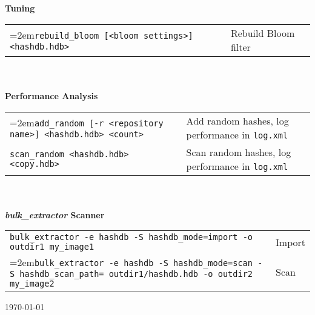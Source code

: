 \documentclass[12pt]{article}
\newcommand{\bulk}{\emph{bulk\_extractor}\xspace}
\begin{document}
\\
\\
\textbf{Tuning}\\
\begin{tabular}{p{3.6 in} p{4 in}}
\hangindent=2em\small\texttt{rebuild\_bloom [<bloom settings>] <hashdb.hdb>} & Rebuild Bloom filter \\
\end{tabular}
\\
\\
\textbf{Performance Analysis}\\
\begin{tabular}{p{3.6 in} p{4 in}}
\hangindent=2em\small\texttt{add\_random [-r <repository name>] <hashdb.hdb> <count>} & Add random hashes, log performance in \texttt{log.xml}\\
\small\texttt{scan\_random <hashdb.hdb> <copy.hdb>} & Scan random hashes, log performance in \texttt{log.xml}\\
\end{tabular}
\\
\\
\textbf{\bulk Scanner}\\
\begin{tabular}{p{6.0 in} l}
\small\texttt{bulk\_extractor -e hashdb -S hashdb\_mode=import -o outdir1 my\_image1} & Import \\
\hangindent=2em\small\texttt{bulk\_extractor -e hashdb -S hashdb\_mode=scan -S hashdb\_scan\_path= outdir1/hashdb.hdb -o outdir2 my\_image2} & Scan \\
\end{tabular}

\vspace{2mm}
\begin{center}
\begin{footnotesize}
\today
\end{footnotesize}
\end{center}
\end{document}
